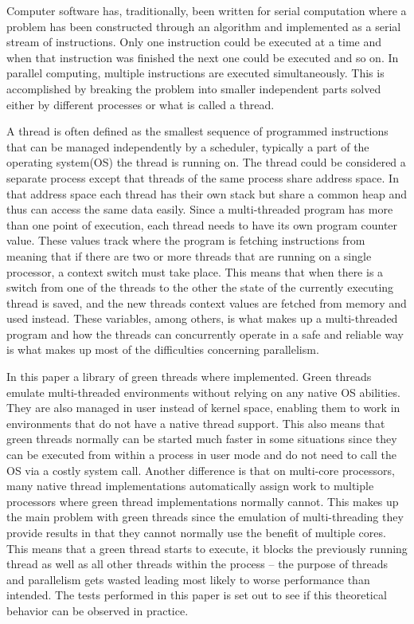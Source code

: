 \documentclass{article}
\begin{document}
Computer software has, traditionally, been written for serial computation where a problem has been constructed through an algorithm and implemented as a serial stream of instructions. Only one instruction could be executed at a time and when that instruction was finished the next one could be executed and so on. In parallel computing, multiple instructions are executed simultaneously. This is accomplished by breaking the problem into smaller independent parts solved either by different processes or what is called a thread.

A thread is often defined as the smallest sequence of programmed instructions that can be managed independently by a scheduler, typically a part of the operating system(OS) the thread is running on. The thread could be considered a separate process except that threads of the same process share address space. In that address space each thread has their own stack but share a common heap and thus can access the same data easily. Since a multi-threaded program has more than one point of execution, each thread needs to have its own program counter value. These values track where the program is fetching instructions from meaning that if there are two or more threads that are running on a single processor, a context switch must take place. This means that when there is a switch from one of the threads to the other the state of the currently executing thread is saved, and the new threads context values are fetched from memory and used instead. These variables, among others, is what makes up a multi-threaded program and how the threads can concurrently operate in a safe and reliable way is what makes up most of the difficulties concerning parallelism.  

In this paper a library of green threads where implemented. Green threads emulate multi-threaded environments without relying on any native OS abilities. They are also managed in user instead of kernel space, enabling them to work in environments that do not have a native thread support. This also means that green threads normally can be started much faster in some situations since they can be executed from within a process in user mode and do not need to call the OS via a costly system call. Another difference is that on multi-core processors, many native thread implementations automatically assign work to multiple processors where green thread implementations normally cannot. This makes up the main problem with green threads since the emulation of multi-threading they provide results in that they cannot normally use the benefit of multiple cores. This means that a green thread starts to execute, it blocks the previously running thread  as well as all other threads within the process – the purpose of threads and parallelism gets wasted leading most likely to worse performance than intended. The tests performed in this paper is set out to see if this theoretical behavior can be observed in practice.
\end{document}
